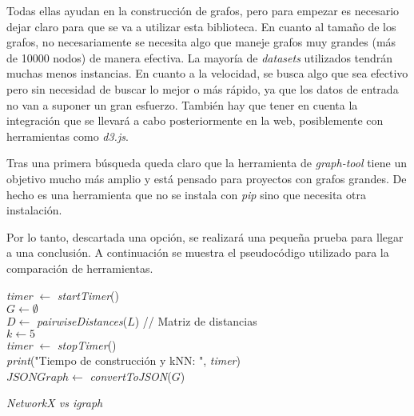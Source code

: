 Todas ellas ayudan en la construcción de grafos, pero para empezar es necesario dejar claro para que se va a utilizar esta biblioteca. En cuanto al tamaño de los grafos, no necesariamente se necesita algo que maneje grafos muy grandes (más de 10000 nodos) de manera efectiva. La mayoría de \textit{datasets} utilizados tendrán muchas menos instancias. En cuanto a la velocidad, se busca algo que sea efectivo pero sin necesidad de buscar lo mejor o más rápido, ya que los datos de entrada no van a suponer un gran esfuerzo. También hay que tener en cuenta la integración que se llevará a cabo posteriormente en la web, posiblemente con herramientas como \textit{d3.js}.

Tras una primera búsqueda queda claro que la herramienta de \textit{graph-tool} tiene un objetivo mucho más amplio y está pensado para proyectos con grafos grandes. De hecho es una herramienta que no se instala con \textit{pip} sino que necesita otra instalación.

Por lo tanto, descartada una opción, se realizará una pequeña prueba para llegar a una conclusión. A continuación se muestra el pseudocódigo utilizado para la comparación de herramientas.

\begin{algorithm}
	\label{testGraph}
	\BlankLine
	\textit{timer} $\leftarrow$ \textit{startTimer}()\\
	$G \leftarrow \emptyset$\\
	$D \leftarrow$ \textit{pairwiseDistances}($L$) // Matriz de distancias\\
	$k \leftarrow 5$\\
	\textit{timer} $\leftarrow$ \textit{stopTimer}()\\
	\textit{print}("Tiempo de construcción y kNN: ", \textit{timer})\\
	$JSONGraph \leftarrow$ \textit{convertToJSON}($G$)\\
	\caption{\textit{NetworkX vs igraph}}
\end{algorithm}

